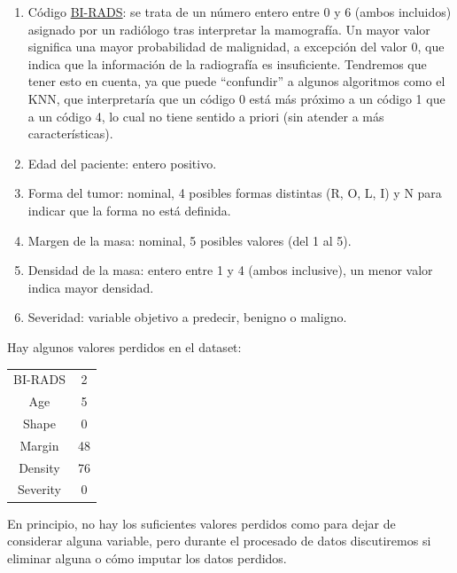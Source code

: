 \documentclass{article}
\begin{document}
\begin{enumerate}
\item Código \href{https://es.wikipedia.org/wiki/BI-RADS}{BI-RADS}: se
  trata de un número entero entre 0 y 6 (ambos incluidos) asignado por
  un radiólogo tras interpretar la mamografía. Un mayor valor
  significa una mayor probabilidad de malignidad, a excepción del
  valor 0, que indica que la información de la radiografía es
  insuficiente. Tendremos que tener esto en cuenta, ya que puede
  ``confundir'' a algunos algoritmos como el KNN, que interpretaría
  que un código 0 está más próximo a un código 1 que a un código 4, lo
  cual no tiene sentido a priori (sin atender a más características).

\item Edad del paciente: entero positivo.
\item Forma del tumor: nominal, 4 posibles formas distintas (R, O, L,
  I) y N para indicar que la forma no está definida.
\item Margen de la masa: nominal, 5 posibles valores (del 1 al 5).
\item Densidad de la masa: entero entre 1 y 4 (ambos inclusive), un
  menor valor indica mayor densidad.
\item Severidad: variable objetivo a predecir, benigno o maligno. 
\end{enumerate}

Hay algunos valores perdidos en el dataset: \vspace{-5mm}
\begin{table}[H]
  \centering
  \begin{tabular}{c|c}
    BI-RADS     & 2 \\
    Age         & 5 \\
    Shape       & 0 \\
    Margin      & 48 \\
    Density     & 76 \\
    Severity    & 0
  \end{tabular}
\end{table}
\vspace{-8mm} En principio, no hay los suficientes valores perdidos como
para dejar de considerar alguna variable, pero durante el procesado de
datos discutiremos si eliminar alguna o cómo imputar los datos
perdidos.
\end{document}
